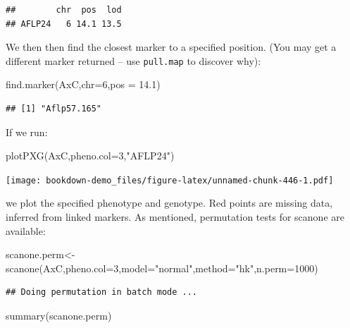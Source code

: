 \documentclass[
]{book}
\newenvironment{Shaded}{\begin{snugshade}}{\end{snugshade}}
\newcommand{\AttributeTok}[1]{\textcolor[rgb]{0.77,0.63,0.00}{#1}}
\newcommand{\DecValTok}[1]{\textcolor[rgb]{0.00,0.00,0.81}{#1}}
\newcommand{\FloatTok}[1]{\textcolor[rgb]{0.00,0.00,0.81}{#1}}
\newcommand{\FunctionTok}[1]{\textcolor[rgb]{0.00,0.00,0.00}{#1}}
\newcommand{\NormalTok}[1]{#1}
\newcommand{\OtherTok}[1]{\textcolor[rgb]{0.56,0.35,0.01}{#1}}
\newcommand{\StringTok}[1]{\textcolor[rgb]{0.31,0.60,0.02}{#1}}
\begin{document}
\begin{verbatim}
##        chr  pos  lod
## AFLP24   6 14.1 13.5
\end{verbatim}

We then then find the closest marker to a specified position. (You may get a different marker returned -- use \texttt{pull.map} to discover why):

\begin{Shaded}
\begin{Highlighting}[]
\FunctionTok{find.marker}\NormalTok{(AxC,}\AttributeTok{chr=}\DecValTok{6}\NormalTok{,}\AttributeTok{pos =} \FloatTok{14.1}\NormalTok{) }
\end{Highlighting}
\end{Shaded}

\begin{verbatim}
## [1] "Aflp57.165"
\end{verbatim}

If we run:

\begin{Shaded}
\begin{Highlighting}[]
\FunctionTok{plotPXG}\NormalTok{(AxC,}\AttributeTok{pheno.col=}\DecValTok{3}\NormalTok{,}\StringTok{"AFLP24"}\NormalTok{) }
\end{Highlighting}
\end{Shaded}

\texttt{[image: bookdown-demo\_files/figure-latex/unnamed-chunk-446-1.pdf]}

we plot the specified phenotype and genotype. Red points are missing data, inferred from linked markers. As mentioned, permutation tests for scanone are available:

\begin{Shaded}
\begin{Highlighting}[]
\NormalTok{scanone.perm}\OtherTok{\textless{}{-}}\FunctionTok{scanone}\NormalTok{(AxC,}\AttributeTok{pheno.col=}\DecValTok{3}\NormalTok{,}\AttributeTok{model=}\StringTok{"normal"}\NormalTok{,}\AttributeTok{method=}\StringTok{"hk"}\NormalTok{,}\AttributeTok{n.perm=}\DecValTok{1000}\NormalTok{) }
\end{Highlighting}
\end{Shaded}

\begin{verbatim}
## Doing permutation in batch mode ...
\end{verbatim}

\begin{Shaded}
\begin{Highlighting}[]
\FunctionTok{summary}\NormalTok{(scanone.perm) }
\end{Highlighting}
\end{Shaded}
\end{document}
